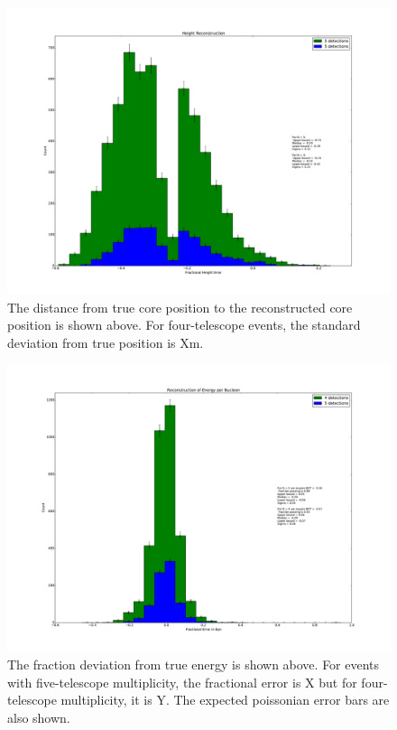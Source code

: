 \documentclass[11pt]{article}
\begin{document}
\begin{figure}
\begin{center}
\includegraphics[width=\textwidth]{rawheight}
\caption{The distance from true core position to the reconstructed core position is shown above. For four-telescope events, the standard deviation from true position is Xm.}
\label{fig:height}
\end{center}
\end{figure}

\begin{figure}
\begin{center}
\includegraphics[width=\textwidth]{epn}
\caption{The fraction deviation from true energy is shown above. For events with five-telescope multiplicity, the fractional error is X but for four-telescope multiplicity, it is Y. The expected poissonian error bars are also shown.}
\label{fig:epn}
\end{center}
\end{figure}  
\end{document}
